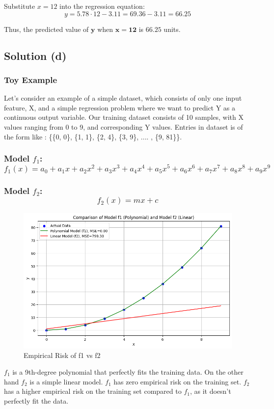 \documentclass{article}
\begin{document}
Substitute \(x = 12\) into the regression equation:
\[
y = 5.78 \cdot 12 - 3.11 = 69.36 - 3.11 = 66.25
\]

\hspace{-15pt}Thus, the predicted value of $\mathbf{y}$ when $\mathbf{x = 12}$ is $\mathbf{66.25}$ units.


\vspace{10pt}
\subsection*{Solution (d)}
\subsubsection*{Toy Example}
Let's consider an example of a simple dataset, which consists of only one input feature, X, and a simple regression problem where we want to predict Y as a continuous output variable. Our training dataset consists of 10 samples, with X values ranging from 0 to 9, and corresponding Y values.
Entries in dataset is of the form like : \{\{0, 0\}, \{1, 1\}, \{2, 4\}, \{3, 9\}, .... , \{9, 81\}\}.

\subsubsection*{Model $f_1$: $$f_1(x) = a_0 + a_1x + a_2x^2 + a_3x^3 + a_4x^4 + a_5x^5 + a_6x^6 + a_7x^7 + a_8x^8 + a_9x^9$$}

\subsubsection*{Model $f_2$: $$f_2(x) = mx + c$$}

\begin{figure}[H] %
    \centering
    \includegraphics[width=0.5\linewidth]{assets/Ad.png}
    \caption{Empirical Risk of f1 vs f2}
    \label{fig:a}
\end{figure}

$f_1$ is a 9th-degree polynomial that perfectly fits the training data. On the other hand $f_2$ is a simple linear model. 
$f_1$ has zero empirical risk on the training set. $f_2$ has a higher empirical risk on the training set compared to $f_1$, as it doesn't perfectly fit the data.
\end{document}
